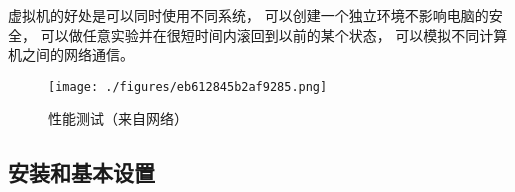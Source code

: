 

\begin{issues}
\issueDraft
\end{issues}

虚拟机的好处是可以同时使用不同系统， 可以创建一个独立环境不影响电脑的安全， 可以做任意实验并在很短时间内滚回到以前的某个状态， 可以模拟不同计算机之间的网络通信。

\begin{figure}[ht]
\centering
\texttt{[image: ./figures/eb612845b2af9285.png]}
\caption{性能测试（来自网络）} \label{fig_VirBox_1}
\end{figure}

\subsection{安装和基本设置}

